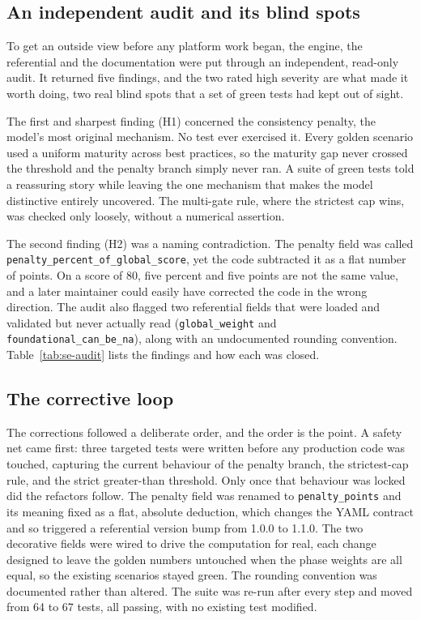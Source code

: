 \subsection{An independent audit and its blind spots}

To get an outside view before any platform work began, the engine, the referential
and the documentation were put through an independent, read-only audit. It returned
five findings, and the two rated high severity are what made it worth doing, two
real blind spots that a set of green tests had kept out of sight.

The first and sharpest finding (H1) concerned the consistency penalty, the model's
most original mechanism. No test ever exercised it. Every golden scenario used a
uniform maturity across best practices, so the maturity gap never crossed the
threshold and the penalty branch simply never ran. A suite of green tests told a
reassuring story while leaving the one mechanism that makes the model distinctive
entirely uncovered. The multi-gate rule, where the strictest cap wins, was checked
only loosely, without a numerical assertion.

The second finding (H2) was a naming contradiction. The penalty field was called
\texttt{penalty\_percent\_\allowbreak of\_\allowbreak global\_score}, yet the code
subtracted it as a flat number of points. On a score of 80, five percent and five points are not the same
value, and a later maintainer could easily have corrected the code in the wrong
direction. The audit also flagged two referential fields that were loaded and
validated but never actually read (\texttt{global\_weight} and
\texttt{foundational\_can\_be\_na}), along with an undocumented rounding convention.
Table~\ref{tab:se-audit} lists the findings and how each was closed.

\subsection{The corrective loop}

The corrections followed a deliberate order, and the order is the point. A safety
net came first: three targeted tests were written before any production code was
touched, capturing the current behaviour of the penalty branch, the strictest-cap
rule, and the strict greater-than threshold. Only once that behaviour was
locked did the refactors follow. The penalty field was renamed to
\texttt{penalty\_points} and its meaning fixed as a flat, absolute deduction, which
changes the YAML contract and so triggered a referential version bump from 1.0.0 to
1.1.0. The two decorative fields were wired to drive the computation for real, each
change designed to leave the golden numbers untouched when the phase weights are all
equal, so the existing scenarios stayed green. The rounding convention was
documented rather than altered. The suite was re-run after every step and moved from
64 to 67 tests, all passing, with no existing test modified.

